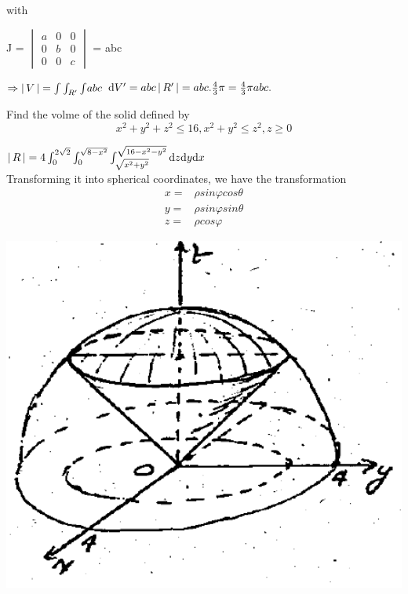 \documentclass[11pt]{amsbook}
\begin{document}
with \\
\begin{center}
	J = 
	$\begin{vmatrix}
		a & 0 & 0 \\
		0 & b & 0   \\
		0 & 0 & c
	\end{vmatrix}$
	= abc
\end{center}
$\Rightarrow   \left \lvert \, V \, \right \rvert = \int\int_{R'}\int \! abc $ $\mathrm{d} V' = abc \left \lvert \, R' \, \right \rvert = abc. \frac{4}{3} \pi = \frac{4}{3}\pi abc.$
\begin{center}
	\begin{exmp} Find the volme of the solid defined by \\
		\begin{equation*}
			x^{2} + y^{2} + z^{2} \leq 16,  x^{2} + y^{2} \leq z^{2},    z \geq 0
		\end{equation*}
	\end{exmp}
\end{center}
\begin{minipage}{0.75\textwidth}
	\begin{hSolution}
		$\left \lvert \, R \, \right \rvert = 4 \int_{0}^{2\sqrt{2}} \int_{0}^{\sqrt{8-x^2}} \int^{\sqrt{16-x^2-y^2}}_{\sqrt{x^2+y^2}} \mathrm{d}{z} \mathrm{d}{y} \mathrm{d}{x} $\\
		\quad Transforming it into spherical coordinates, we have the transformation
		\begin{align*}
			x=& \rho sin \varphi cos \theta \\
			y =& \rho sin \varphi sin \theta \\
			z =& \rho cos \varphi
		\end{align*}
	\end{hSolution}
\end{minipage}
\begin{minipage}{0.55\textwidth}
	\includegraphics[width=1.0\textwidth,keepaspectratio=true]{images/b2p2-427-fig01}
\end{minipage}
\end{document}

